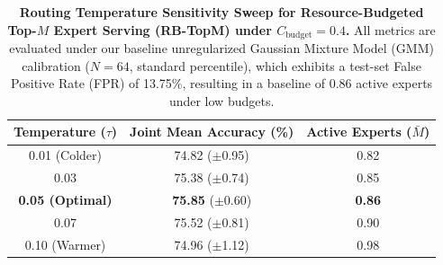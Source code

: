 \documentclass{article}
\theoremstyle{plain}
\theoremstyle{definition}
\theoremstyle{remark}
\begin{document}
\begin{table}[h]
\caption{\textbf{Routing Temperature Sensitivity Sweep for Resource-Budgeted Top-$M$ Expert Serving (RB-TopM) under $C_{\text{budget}}=0.4$.} All metrics are evaluated under our baseline unregularized Gaussian Mixture Model (GMM) calibration ($N=64$, standard percentile), which exhibits a test-set False Positive Rate (FPR) of 13.75\%, resulting in a baseline of 0.86 active experts under low budgets.}
\label{tab:app_temperature_sweep}
\vskip 0.1in
\begin{center}
\begin{small}
\begin{sc}
\begin{tabular}{ccc}
\toprule
Temperature ($\tau$) & Joint Mean Accuracy (\%) & Active Experts ($\bar{M}$) \\
\midrule
0.01 (Colder) & 74.82 ($\pm$0.95) & 0.82 \\
0.03 & 75.38 ($\pm$0.74) & 0.85 \\
\textbf{0.05 (Optimal)} & \textbf{75.85} ($\pm$0.60) & \textbf{0.86} \\
0.07 & 75.52 ($\pm$0.81) & 0.90 \\
0.10 (Warmer) & 74.96 ($\pm$1.12) & 0.98 \\
\bottomrule
\end{tabular}
\end{sc}
\end{small}
\end{center}
\vskip -0.1in
\end{table}
\end{document}
